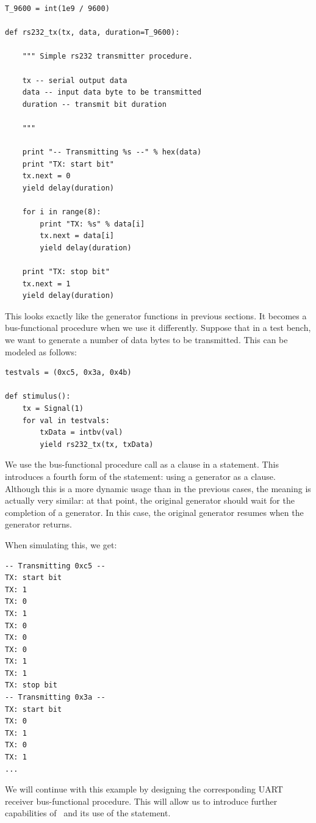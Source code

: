 \begin{verbatim}
T_9600 = int(1e9 / 9600)

def rs232_tx(tx, data, duration=T_9600):
    
    """ Simple rs232 transmitter procedure.

    tx -- serial output data
    data -- input data byte to be transmitted
    duration -- transmit bit duration
    
    """

    print "-- Transmitting %s --" % hex(data)
    print "TX: start bit"      
    tx.next = 0
    yield delay(duration)

    for i in range(8):
        print "TX: %s" % data[i]
        tx.next = data[i]
        yield delay(duration)

    print "TX: stop bit"      
    tx.next = 1
    yield delay(duration)
\end{verbatim}

This looks exactly like the generator functions in previous sections. It
becomes a bus-functional procedure when we use it differently. Suppose
that in a test bench, we want to generate a number of data bytes to be
transmitted. This can be modeled as follows:


\begin{verbatim}
testvals = (0xc5, 0x3a, 0x4b)

def stimulus():
    tx = Signal(1)
    for val in testvals:
        txData = intbv(val)
        yield rs232_tx(tx, txData)
\end{verbatim}

We use the bus-functional procedure call as a clause in a
 statement. This introduces a fourth form of the
 statement: using a generator as a clause. Although this is
a more dynamic usage than in the previous cases, the meaning is
actually very similar: at that point,
the original generator should 
wait for the completion of a generator. 
In this case, the original generator resumes when the
 generator returns.

When simulating this, we get:

\begin{verbatim}
-- Transmitting 0xc5 --
TX: start bit
TX: 1
TX: 0
TX: 1
TX: 0
TX: 0
TX: 0
TX: 1
TX: 1
TX: stop bit
-- Transmitting 0x3a --
TX: start bit
TX: 0
TX: 1
TX: 0
TX: 1
...
\end{verbatim}

We will continue with this example by designing the corresponding UART
receiver bus-functional procedure. This will allow us to introduce
further capabilities of \myhdl\ and its use of the 
statement. 

